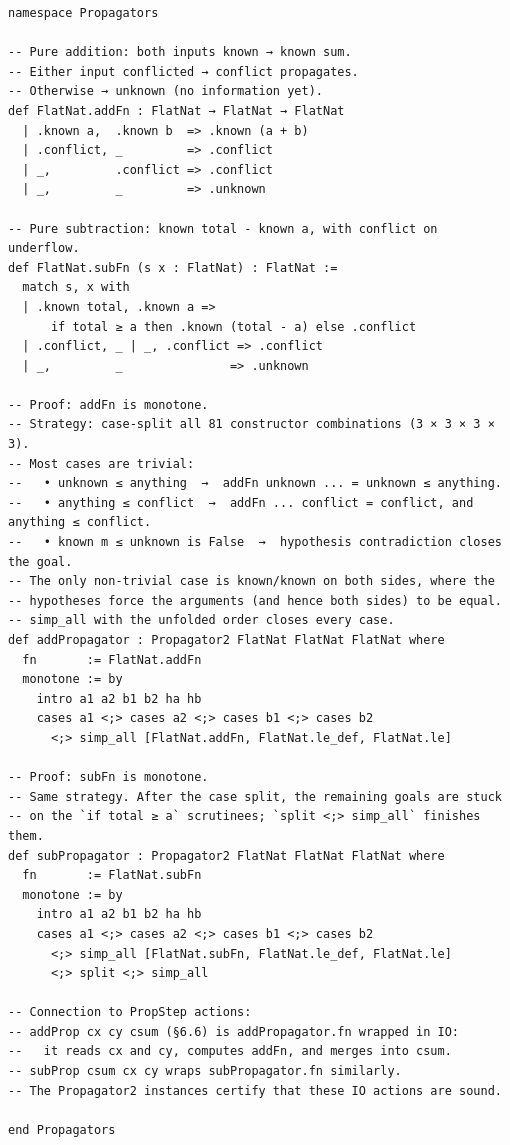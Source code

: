 \documentclass[12pt, a4paper, openright]{book}
\theoremstyle{thmstyle}
\theoremstyle{defstyle}
\begin{document}
\begin{verbatim}
namespace Propagators

-- Pure addition: both inputs known → known sum.
-- Either input conflicted → conflict propagates.
-- Otherwise → unknown (no information yet).
def FlatNat.addFn : FlatNat → FlatNat → FlatNat
  | .known a,  .known b  => .known (a + b)
  | .conflict, _         => .conflict
  | _,         .conflict => .conflict
  | _,         _         => .unknown

-- Pure subtraction: known total - known a, with conflict on underflow.
def FlatNat.subFn (s x : FlatNat) : FlatNat :=
  match s, x with
  | .known total, .known a =>
      if total ≥ a then .known (total - a) else .conflict
  | .conflict, _ | _, .conflict => .conflict
  | _,         _               => .unknown

-- Proof: addFn is monotone.
-- Strategy: case-split all 81 constructor combinations (3 × 3 × 3 × 3).
-- Most cases are trivial:
--   • unknown ≤ anything  →  addFn unknown ... = unknown ≤ anything.
--   • anything ≤ conflict  →  addFn ... conflict = conflict, and anything ≤ conflict.
--   • known m ≤ unknown is False  →  hypothesis contradiction closes the goal.
-- The only non-trivial case is known/known on both sides, where the
-- hypotheses force the arguments (and hence both sides) to be equal.
-- simp_all with the unfolded order closes every case.
def addPropagator : Propagator2 FlatNat FlatNat FlatNat where
  fn       := FlatNat.addFn
  monotone := by
    intro a1 a2 b1 b2 ha hb
    cases a1 <;> cases a2 <;> cases b1 <;> cases b2
      <;> simp_all [FlatNat.addFn, FlatNat.le_def, FlatNat.le]

-- Proof: subFn is monotone.
-- Same strategy. After the case split, the remaining goals are stuck
-- on the `if total ≥ a` scrutinees; `split <;> simp_all` finishes them.
def subPropagator : Propagator2 FlatNat FlatNat FlatNat where
  fn       := FlatNat.subFn
  monotone := by
    intro a1 a2 b1 b2 ha hb
    cases a1 <;> cases a2 <;> cases b1 <;> cases b2
      <;> simp_all [FlatNat.subFn, FlatNat.le_def, FlatNat.le]
      <;> split <;> simp_all

-- Connection to PropStep actions:
-- addProp cx cy csum (§6.6) is addPropagator.fn wrapped in IO:
--   it reads cx and cy, computes addFn, and merges into csum.
-- subProp csum cx cy wraps subPropagator.fn similarly.
-- The Propagator2 instances certify that these IO actions are sound.

end Propagators
\end{verbatim}
\end{document}
